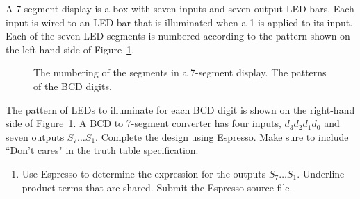 \begin{enumerate}
            A 7-segment display is a box with seven inputs and seven output LED bars.
            Each input is wired to an LED bar that is illuminated when a 1 is applied
            to its input.
            Each of the seven LED segments is numbered according to the pattern shown
            on the left-hand side of Figure~\ref{fig:BCD}.

            \begin{figure}[ht]
                \caption{The numbering of the segments in a 7-segment display.
                The patterns of the BCD digits.}
                \label{fig:BCD}
            \end{figure}

            The pattern of LEDs to illuminate for each BCD digit is shown on the
            right-hand side of Figure~\ref{fig:BCD}.  A BCD to 7-segment converter
            has four inputs, $d_3 d_2 d_1 d_0$ and seven outputs $S_7 \ldots S_1$.
            Complete the design using Espresso.  Make sure to include ``Don't cares"
            in the truth table specification.
            \begin{enumerate}
                \item Use Espresso to determine the \SOPmin expression for the outputs
                    $S_7 \ldots S_1$.  Underline product terms that are shared.
                    Submit the Espresso source file.


\end{enumerate}
\end{enumerate}

